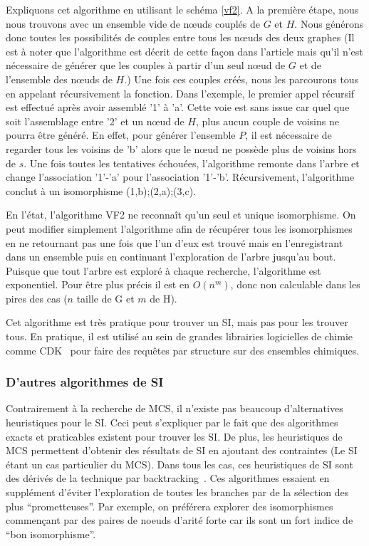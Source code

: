 Expliquons cet algorithme en utilisant le schéma \ref{vf2}.
A la première étape, nous nous trouvons avec un ensemble vide de n\oe{}uds couplés de $G$ et $H$.
Nous générons donc toutes les possibilités de couples entre tous les n\oe{}uds des deux graphes (Il est à noter que l'algorithme
est décrit de cette façon dans l'article mais qu'il n'est nécessaire de générer que les couples à partir d'un seul n\oe{}ud de $G$
et de l'ensemble des n\oe{}uds de $H$.)
Une fois ces couples créés, nous les parcourons tous en appelant récursivement la fonction.
Dans l'exemple, le premier appel récursif est effectué après avoir assemblé '1' à 'a'.
Cette voie est sans issue car quel que soit l'assemblage entre '2' et un n\oe{}ud de $H$, plus aucun couple de voisins ne pourra être
généré.
En effet, pour générer l'ensemble $P$, il est nécessaire de regarder tous les voisins de 'b' alors que le n\oe{}ud ne possède plus
de voisins hors de $s$.
Une fois toutes les tentatives échouées, l'algorithme remonte dans l'arbre et change l'association '1'-'a' pour l'association
'1'-'b'.
Récursivement, l'algorithme conclut à un isomorphisme {(1,b);(2,a);(3,c)}.

En l'état, l'algorithme VF2 ne reconnaît qu'un seul et unique isomorphisme.
On peut modifier simplement l'algorithme afin de récupérer tous les isomorphismes en ne retournant pas une fois que l'un d'eux est
trouvé mais en l'enregistrant dans un ensemble puis en continuant l'exploration de l'arbre jusqu'au bout.
Puisque que tout l'arbre est exploré à chaque recherche, l'algorithme est exponentiel.
Pour être plus précis il est en $O(n^m)$, donc non calculable dans les pires des cas ($n$ taille de G et $m$ de H).

Cet algorithme est très pratique pour trouver un SI, mais pas pour les trouver tous.
En pratique, il est utilisé au sein de grandes librairies logicielles de chimie comme CDK~\cite{steinbeck_chemistry_2003} pour faire des requêtes par structure sur des ensembles chimiques.


\subsubsection{D'autres algorithmes de SI}

Contrairement à la recherche de MCS, il n'existe pas beaucoup d'alternatives heuristiques pour le SI.
Ceci peut s'expliquer par le fait que des algorithmes exacts et praticables existent pour trouver les SI.
De plus, les heuristiques de MCS permettent d'obtenir des résultats de SI en ajoutant des contraintes (Le SI étant un cas particulier du MCS).
Dans tous les cas, ces heuristiques de SI sont des dérivés de la technique par backtracking~\cite{kaijar_developing_2012}.
Ces algorithmes essaient en supplément d'éviter l'exploration de toutes les branches par de la sélection des plus ``prometteuses''.
Par exemple, on préférera explorer des isomorphismes commençant par des paires de noeuds d'arité forte car ils sont un fort indice de ``bon isomorphisme''.

